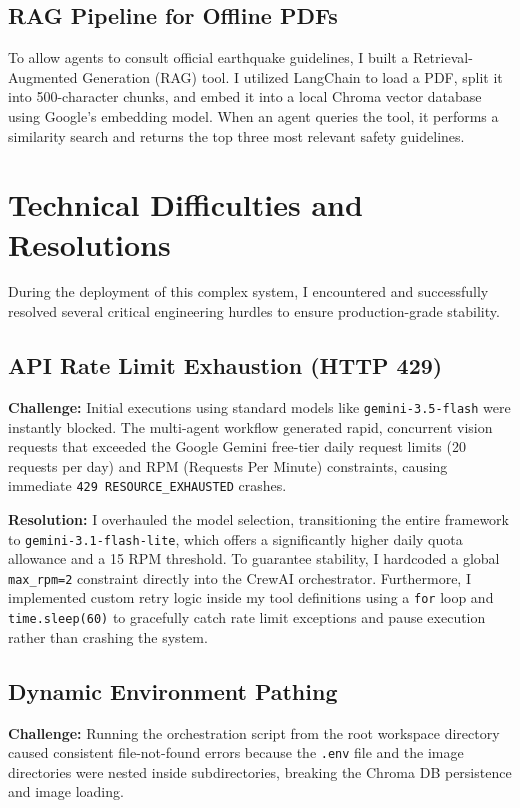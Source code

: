 \documentclass[conference,twocolumn,twoside]{IEEEtran}
\begin{document}
\subsection{RAG Pipeline for Offline PDFs}
To allow agents to consult official earthquake guidelines, I built a Retrieval-Augmented Generation (RAG) tool. I utilized LangChain to load a PDF, split it into 500-character chunks, and embed it into a local Chroma vector database using Google's embedding model. When an agent queries the tool, it performs a similarity search and returns the top three most relevant safety guidelines.

\section{Technical Difficulties and Resolutions}
During the deployment of this complex system, I encountered and successfully resolved several critical engineering hurdles to ensure production-grade stability.

\subsection{API Rate Limit Exhaustion (HTTP 429)}
\textbf{Challenge:} Initial executions using standard models like \texttt{gemini-3.5-flash} were instantly blocked. The multi-agent workflow generated rapid, concurrent vision requests that exceeded the Google Gemini free-tier daily request limits (20 requests per day) and RPM (Requests Per Minute) constraints, causing immediate \texttt{429 RESOURCE\_EXHAUSTED} crashes.

\textbf{Resolution:} I overhauled the model selection, transitioning the entire framework to \texttt{gemini-3.1-flash-lite}, which offers a significantly higher daily quota allowance and a 15 RPM threshold. To guarantee stability, I hardcoded a global \texttt{max\_rpm=2} constraint directly into the CrewAI orchestrator. Furthermore, I implemented custom retry logic inside my tool definitions using a \texttt{for} loop and \texttt{time.sleep(60)} to gracefully catch rate limit exceptions and pause execution rather than crashing the system.

\subsection{Dynamic Environment Pathing}
\textbf{Challenge:} Running the orchestration script from the root workspace directory caused consistent file-not-found errors because the \texttt{.env} file and the image directories were nested inside subdirectories, breaking the Chroma DB persistence and image loading.
\end{document}
